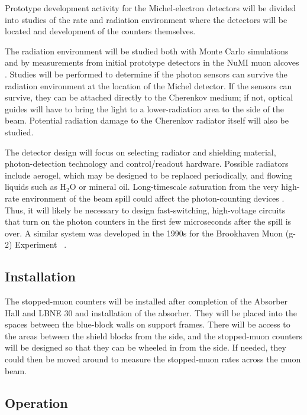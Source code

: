 Prototype development activity for the Michel-electron detectors will
be divided into studies of the rate and radiation environment where
the detectors will be located and development of the counters
themselves.

The radiation environment will be studied both with Monte Carlo 
simulations and by
measurements from initial prototype detectors in the NuMI muon alcoves
\cite{ref:NuMIBeamMonitors}.
Studies will be performed to determine if the photon sensors
can survive the radiation environment at the location of the Michel
detector. If the sensors can survive, they can be attached directly to
the Cherenkov medium; if not, optical guides will have to bring the
light to a lower-radiation area to the side of the beam. Potential
radiation damage to the Cherenkov radiator itself will also be
studied.

The detector design will focus on selecting radiator and shielding
material, photon-detection technology and control/readout
hardware. Possible radiators include aerogel, which may be designed to
be replaced periodically, and flowing liquids such as H$_2$O or
mineral oil. Long-timescale saturation from the very high-rate
environment of the beam spill could affect the photon-counting devices
\cite{ref:HighRateCounting}. Thus, it will likely be necessary to
design fast-switching, high-voltage circuits that turn on the photon
counters in the first few microseconds after the spill is over. A
similar system was developed in the 1990s for the Brookhaven Muon
(g-2) Experiment~\cite{ref:G2} .

\subsection{Installation}

The stopped-muon counters will be installed after completion of the 
Absorber Hall and LBNE 30  
and installation of the absorber. 
They will be placed into the spaces between the blue-block walls on
support frames.   There will be access to the areas between the shield blocks 
from the side, and the stopped-muon counters will be designed so that they can 
be wheeled in from the side.  If needed, they could then be moved around to measure
the stopped-muon rates across the muon beam.

\subsection{Operation}

